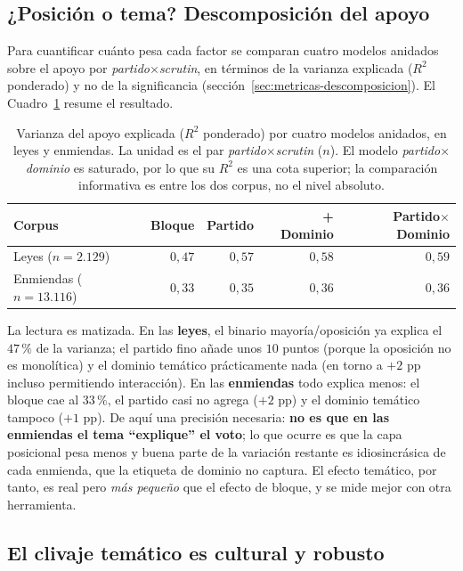 \subsection{¿Posición o tema? Descomposición del apoyo}
\label{sec:res-revelada-descomposicion}

Para cuantificar cuánto pesa cada factor se comparan cuatro modelos anidados
sobre el apoyo por \emph{partido$\times$scrutin}, en términos de la varianza
explicada ($R^2$ ponderado) y no de la significancia
(sección~\ref{sec:metricas-descomposicion}). El Cuadro~\ref{tab:r2-voto} resume
el resultado.

\begin{table}[H]
\centering
\caption{Varianza del apoyo explicada ($R^2$ ponderado) por cuatro modelos
anidados, en leyes y enmiendas. La unidad es el par \emph{partido$\times$scrutin}
($n$). El modelo \emph{partido$\times$dominio} es saturado, por lo que su $R^2$ es
una cota superior; la comparación informativa es entre los dos corpus, no el
nivel absoluto.}
\label{tab:r2-voto}
\begin{tabular}{@{}l r r r r@{}}
\toprule
\textbf{Corpus} & \textbf{Bloque} & \textbf{Partido} & \textbf{+ Dominio} & \textbf{Partido$\times$Dominio} \\
\midrule
Leyes ($n=2.129$) & $0{,}47$ & $0{,}57$ & $0{,}58$ & $0{,}59$ \\
Enmiendas ($n=13.116$) & $0{,}33$ & $0{,}35$ & $0{,}36$ & $0{,}36$ \\
\bottomrule
\end{tabular}
\end{table}

La lectura es matizada. En las \textbf{leyes}, el binario mayoría/oposición ya
explica el $47\,\%$ de la varianza; el partido fino añade unos $10$ puntos
(porque la oposición no es monolítica) y el dominio temático prácticamente nada
(en torno a $+2$ pp incluso permitiendo interacción). En las \textbf{enmiendas}
todo explica menos: el bloque cae al
$33\,\%$, el partido casi no agrega ($+2$ pp) y el dominio temático tampoco
($+1$ pp). De aquí una precisión necesaria: \textbf{no es que en las enmiendas el
tema ``explique'' el voto}; lo que ocurre es que la capa posicional pesa menos y
buena parte de la variación restante es idiosincrásica de cada enmienda, que la
etiqueta de dominio no captura. El efecto temático, por tanto, es real pero
\emph{más pequeño} que el efecto de bloque, y se mide mejor con otra herramienta.

\subsection{El clivaje temático es cultural y robusto}
\label{sec:res-revelada-clivaje}

